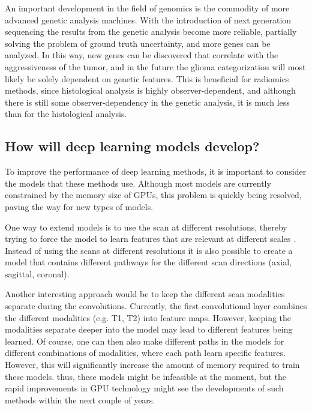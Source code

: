 An important development in the field of genomics is the commodity of more advanced genetic analysis machines.
With the introduction of next generation sequencing the results from the genetic analysis become more reliable, partially solving the problem of ground truth uncertainty, and more genes can be analyzed.
In this way, new genes can be discovered that correlate with the aggressiveness of the \gls{tumor}, and in the future the glioma categorization will most likely be solely dependent on genetic features.
This is beneficial for radiomics methods, since histological analysis is highly observer-dependent, and although there is still some observer-dependency in the genetic analysis, it is much less than for the histological analysis.


\subsection{How will deep learning models develop?}

To improve the performance of deep learning methods, it is important to consider the models that these methods use.
Although most models are currently constrained by the memory size of GPUs, this problem is quickly being resolved, paving the way for new types of models.

One way to extend models is to use the scan at different resolutions, thereby trying to force the model to learn features that are relevant at different scales \autocite{akkus20171p19q}.
Instead of using the scans at different resolutions it is also possible to create a model that contains different pathways for the different scan directions (axial, sagittal, coronal).

Another interesting approach would be to keep the different scan modalities separate during the convolutions.
Currently, the first convolutional layer combines the different modalities (e.g. \acrlong{T1}, \acrlong{T2}) into feature maps.
However, keeping the modalities separate deeper into the model may lead to different features being learned.
Of course, one can then also make different paths in the models for different combinations of modalities, where each path learn specific features.
However, this will significantly increase the amount of memory required to train these models.
thus, these models might be infeasible at the moment, but the rapid improvements in GPU technology might see the developments of such methods within the next couple of years.



